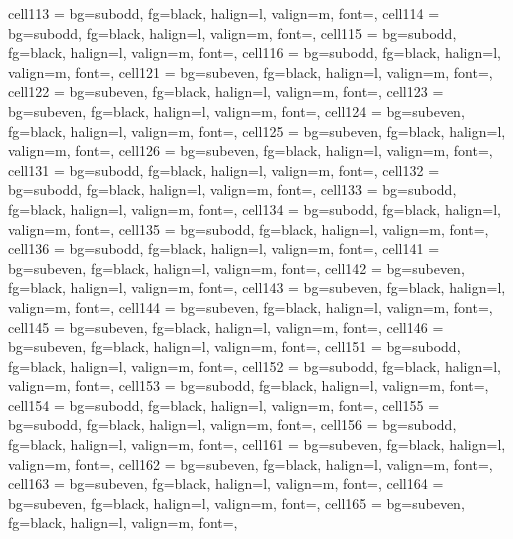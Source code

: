 \documentclass[a4paper,12pt]{article}
\begin{document}
\begin{longtblr}
{  cell{11}{3} = {bg=subodd, fg=black, halign=l, valign=m, font=\footnotesize},
  cell{11}{4} = {bg=subodd, fg=black, halign=l, valign=m, font=\footnotesize},
  cell{11}{5} = {bg=subodd, fg=black, halign=l, valign=m, font=\footnotesize},
  cell{11}{6} = {bg=subodd, fg=black, halign=l, valign=m, font=\footnotesize},
  cell{12}{1} = {bg=subeven, fg=black, halign=l, valign=m, font=\footnotesize},
  cell{12}{2} = {bg=subeven, fg=black, halign=l, valign=m, font=\footnotesize},
  cell{12}{3} = {bg=subeven, fg=black, halign=l, valign=m, font=\footnotesize},
  cell{12}{4} = {bg=subeven, fg=black, halign=l, valign=m, font=\footnotesize},
  cell{12}{5} = {bg=subeven, fg=black, halign=l, valign=m, font=\footnotesize},
  cell{12}{6} = {bg=subeven, fg=black, halign=l, valign=m, font=\footnotesize},
  cell{13}{1} = {bg=subodd, fg=black, halign=l, valign=m, font=\footnotesize},
  cell{13}{2} = {bg=subodd, fg=black, halign=l, valign=m, font=\footnotesize},
  cell{13}{3} = {bg=subodd, fg=black, halign=l, valign=m, font=\footnotesize},
  cell{13}{4} = {bg=subodd, fg=black, halign=l, valign=m, font=\footnotesize},
  cell{13}{5} = {bg=subodd, fg=black, halign=l, valign=m, font=\footnotesize},
  cell{13}{6} = {bg=subodd, fg=black, halign=l, valign=m, font=\footnotesize},
  cell{14}{1} = {bg=subeven, fg=black, halign=l, valign=m, font=\footnotesize},
  cell{14}{2} = {bg=subeven, fg=black, halign=l, valign=m, font=\footnotesize},
  cell{14}{3} = {bg=subeven, fg=black, halign=l, valign=m, font=\footnotesize},
  cell{14}{4} = {bg=subeven, fg=black, halign=l, valign=m, font=\footnotesize},
  cell{14}{5} = {bg=subeven, fg=black, halign=l, valign=m, font=\footnotesize},
  cell{14}{6} = {bg=subeven, fg=black, halign=l, valign=m, font=\footnotesize},
  cell{15}{1} = {bg=subodd, fg=black, halign=l, valign=m, font=\footnotesize},
  cell{15}{2} = {bg=subodd, fg=black, halign=l, valign=m, font=\footnotesize},
  cell{15}{3} = {bg=subodd, fg=black, halign=l, valign=m, font=\footnotesize},
  cell{15}{4} = {bg=subodd, fg=black, halign=l, valign=m, font=\footnotesize},
  cell{15}{5} = {bg=subodd, fg=black, halign=l, valign=m, font=\footnotesize},
  cell{15}{6} = {bg=subodd, fg=black, halign=l, valign=m, font=\footnotesize},
  cell{16}{1} = {bg=subeven, fg=black, halign=l, valign=m, font=\footnotesize},
  cell{16}{2} = {bg=subeven, fg=black, halign=l, valign=m, font=\footnotesize},
  cell{16}{3} = {bg=subeven, fg=black, halign=l, valign=m, font=\footnotesize},
  cell{16}{4} = {bg=subeven, fg=black, halign=l, valign=m, font=\footnotesize},
  cell{16}{5} = {bg=subeven, fg=black, halign=l, valign=m, font=\footnotesize},
}
\end{longtblr}
\end{document}
